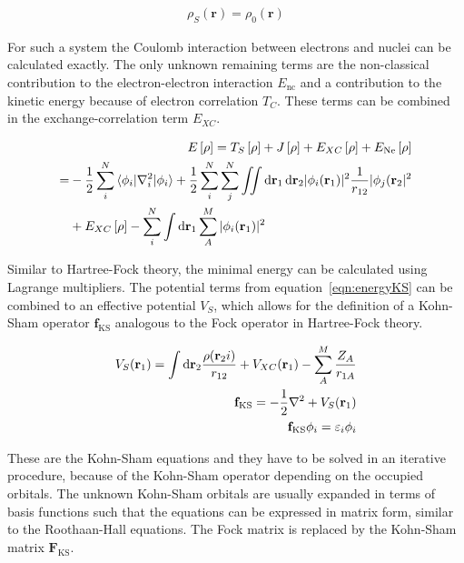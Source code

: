\begin{align}
    \rho_S(\mathbf{r}) = \rho_0(\mathbf{r})
\end{align}

For such a system the Coulomb interaction between electrons and nuclei can be
calculated exactly. The only unknown remaining terms are the non-classical
contribution to the electron-electron interaction $E_\text{nc}$ and a
contribution to the kinetic energy because of electron correlation $T_C$. These
terms can be combined in the exchange-correlation term $E_{XC}$.

\begin{align}
    E\left[\rho\right]=T_S\left[\rho\right] + J\left[\rho\right] + E_{XC}\left[\rho\right] + E_\text{Ne}\left[\rho\right] \\
    \begin{aligned}
    =&-\frac{1}{2}\sum_i^N\braket{\phi_i|\nabla_i^2|\phi_i} + \frac{1}{2}\sum_i^N\sum_j^N\iint \dif\mathbf{r}_1\dif\mathbf{r}_2|\phi_i(\mathbf{r}_1)|^2\frac{1}{r_{12}}|\phi_j(\mathbf{r}_2|^2 \\
        &+ E_{XC}\left[\rho\right] - \sum_i^N\int\dif\mathbf{r}_1\sum_A^M|\phi_i(\mathbf{r}_1)|^2
    \end{aligned}\label{eqn:energyKS}
\end{align}

Similar to Hartree-Fock theory, the minimal energy can be calculated using
Lagrange multipliers. The potential terms from equation~\eqref{eqn:energyKS}
can be combined to an effective potential $V_S$, which allows for the
definition of a Kohn-Sham operator $\mathbf{f}_\text{KS}$ analogous to the Fock
operator in Hartree-Fock theory.

\begin{align}
    V_S(\mathbf{r}_1) = \int\dif\mathbf{r}_2\frac{\rho(\mathbf{r}_2i)}{r_{12}} + V_{XC}(\mathbf{r}_1) - \sum_A^M\frac{Z_A}{r_{1A}}\\
    \mathbf{f}_\text{KS} = -\frac{1}{2}\nabla^2+V_S(\mathbf{r}_1)\\
    \mathbf{f}_\text{KS}\phi_i=\varepsilon_i\phi_i
\end{align}

These are the Kohn-Sham equations and they have to be solved in an iterative
procedure, because of the Kohn-Sham operator depending on the occupied
orbitals.  The unknown Kohn-Sham orbitals are usually expanded in terms of
basis functions such that the equations can be expressed in matrix form,
similar to the Roothaan-Hall equations. The Fock matrix is replaced by the
Kohn-Sham matrix $\mathbf{F}_\text{KS}$.

